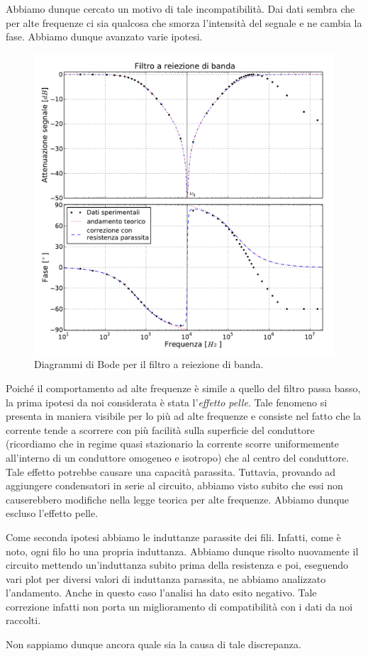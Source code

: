 Abbiamo dunque cercato un motivo di tale incompatibilità. Dai dati sembra che per alte frequenze ci sia qualcosa che smorza l'intensità del segnale e ne cambia la fase. Abbiamo dunque avanzato varie ipotesi.

\begin{figure}
    \includegraphics[width=120mm]{notch.pdf}
    \caption{Diagrammi di Bode per il filtro a reiezione di banda.}
    \label{fig:notch}
\end{figure}

Poiché il comportamento ad alte frequenze è simile a quello del filtro passa basso, la prima ipotesi da noi considerata è stata l'\emph{effetto pelle}. Tale fenomeno si presenta in maniera visibile per lo più ad alte frequenze e consiste nel fatto che la corrente tende a scorrere con più facilità sulla superficie del conduttore (ricordiamo che in regime quasi stazionario la corrente scorre uniformemente all'interno di un conduttore omogeneo e isotropo) che al centro del conduttore. Tale effetto potrebbe causare una capacità parassita. Tuttavia, provando ad aggiungere condensatori in serie al circuito, abbiamo visto subito che essi non causerebbero modifiche nella legge teorica per alte frequenze. Abbiamo dunque escluso l'effetto pelle.

Come seconda ipotesi abbiamo le induttanze parassite dei fili. Infatti, come è noto, ogni filo ho una propria induttanza. Abbiamo dunque risolto nuovamente il circuito mettendo un'induttanza subito prima della resistenza e poi, eseguendo vari plot per diversi valori di induttanza parassita, ne abbiamo analizzato l'andamento. Anche in questo caso l'analisi ha dato esito negativo. Tale correzione infatti non porta un miglioramento di compatibilità con i dati da noi raccolti.

Non sappiamo dunque ancora quale sia la causa di tale discrepanza.